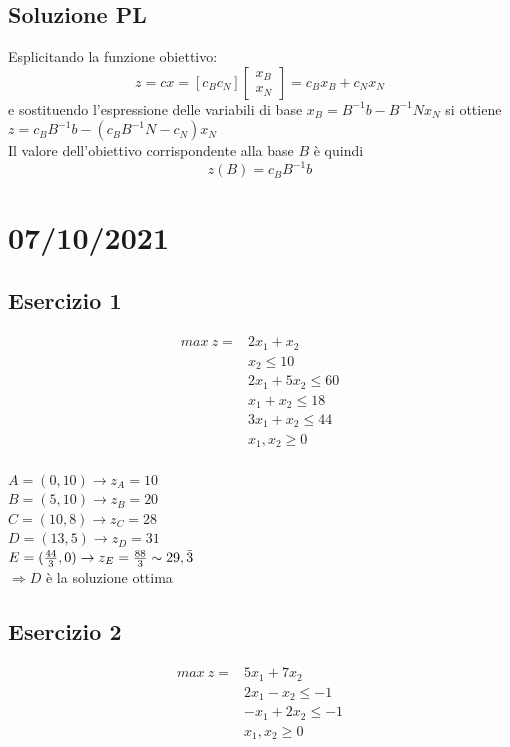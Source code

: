 \documentclass[12pt,a4paper]{article}
\begin{document}
\subsection{Soluzione PL}
Esplicitando la funzione obiettivo:
$$z=cx=[c_Bc_N]\left[\begin{array}{c}x_B\\x_N\end{array}\right] = c_Bx_B + c_Nx_N$$
e sostituendo l'espressione delle variabili di base $x_B=B^{-1}b-B^{-1}Nx_N$ si ottiene $z=c_BB^{-1}b-(c_BB^{-1}N-c_N)x_N$\\
Il valore dell'obiettivo corrispondente alla base $B$ è quindi $$z(B)=c_BB^{-1}b$$

\clearpage
\section{07/10/2021}
\subsection{Esercizio 1}
$$\begin{array}{cl}
max \ z = & 2x_1+x_2\\
 & x_2 \leq 10\\
 & 2x_1 + 5x_2 \leq 60\\
 & x_1+x_2 \leq 18\\
 & 3x_1+x_2 \leq 44\\
 & x_1,x_2 \geq 0
 \end{array}$$\\
 $A=(0,10) \rightarrow z_A = 10$\\
 $B=(5,10) \rightarrow z_B = 20$\\
 $C=(10,8) \rightarrow z_C = 28$\\
 $D=(13,5) \rightarrow z_D = 31$\\
 $E=({44\over 3}, 0) \rightarrow z_E = {88\over 3} \sim 29,\bar 3$\\

$\Longrightarrow D$ è la soluzione ottima

\subsection{Esercizio 2}
$$\begin{array}{cl}
max \ z = & 5x_1+7x_2\\
 & 2x_1-x_2 \leq -1\\
 & -x_1+2x_2 \leq -1\\
 & x_1,x_2 \geq 0
 \end{array}$$\\
 
\end{document}
